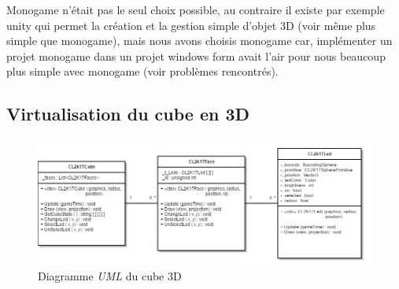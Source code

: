 \documentclass[a4paper,12pt]{article}
\begin{document}
Monogame n'était pas le seul choix possible, au contraire il existe par exemple unity qui permet la création et la gestion simple d'objet 3D (voir même plus simple que monogame), mais nous avons choisis monogame car, implémenter un projet monogame dans un projet windows form avait l'air pour nous beaucoup plus simple avec monogame (voir problèmes rencontrés).

\subsection{Virtualisation du cube en 3D}

\begin{figure}[htp]
	\centering
	\includegraphics[width=15cm]{./Img/DiagrammeUmlCube.png}
	\caption{Diagramme \emph{UML} du cube 3D}
	\label{uml_clcl}
\end{figure}
\end{document}
